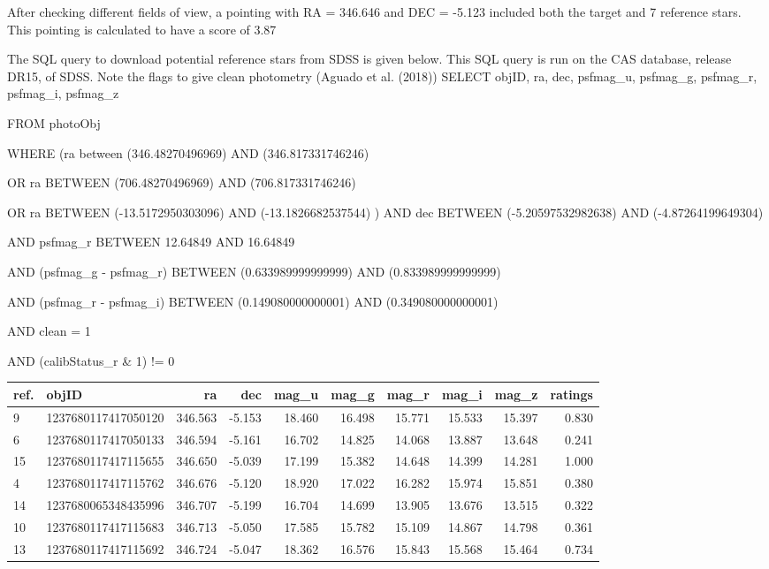 \documentclass[]{elsarticle} %
\begin{document}
After checking different fields of view, a pointing with RA = 346.646
and DEC = -5.123 included both the target and 7 reference stars. This
pointing is calculated to have a score of 3.87 \newpage

The SQL query to download potential reference stars from SDSS is given
below. This SQL query is run on the CAS database, release DR15, of SDSS.
Note the flags to give clean photometry (Aguado et al. (2018))
\vskip 0.2in \noindent SELECT objID, ra, dec, psfmag\_u, psfmag\_g,
psfmag\_r, psfmag\_i, psfmag\_z

FROM photoObj

WHERE (ra between (346.48270496969) AND (346.817331746246)

OR ra BETWEEN (706.48270496969) AND (706.817331746246)

OR ra BETWEEN (-13.5172950303096) AND (-13.1826682537544) ) AND dec
BETWEEN (-5.20597532982638) AND (-4.87264199649304)

AND psfmag\_r BETWEEN 12.64849 AND 16.64849

AND (psfmag\_g - psfmag\_r) BETWEEN (0.633989999999999) AND
(0.833989999999999)

AND (psfmag\_r - psfmag\_i) BETWEEN (0.149080000000001) AND
(0.349080000000001)

AND clean = 1

AND (calibStatus\_r \& 1) != 0 \vskip 0.2in

\begin{tabular}{l|l|r|r|r|r|r|r|r|r}
\hline
ref. & objID & ra & dec & mag\_u & mag\_g & mag\_r & mag\_i & mag\_z & ratings\\
\hline
9 & 1237680117417050120 & 346.563 & -5.153 & 18.460 & 16.498 & 15.771 & 15.533 & 15.397 & 0.830\\
\hline
6 & 1237680117417050133 & 346.594 & -5.161 & 16.702 & 14.825 & 14.068 & 13.887 & 13.648 & 0.241\\
\hline
15 & 1237680117417115655 & 346.650 & -5.039 & 17.199 & 15.382 & 14.648 & 14.399 & 14.281 & 1.000\\
\hline
4 & 1237680117417115762 & 346.676 & -5.120 & 18.920 & 17.022 & 16.282 & 15.974 & 15.851 & 0.380\\
\hline
14 & 1237680065348435996 & 346.707 & -5.199 & 16.704 & 14.699 & 13.905 & 13.676 & 13.515 & 0.322\\
\hline
10 & 1237680117417115683 & 346.713 & -5.050 & 17.585 & 15.782 & 15.109 & 14.867 & 14.798 & 0.361\\
\hline
13 & 1237680117417115692 & 346.724 & -5.047 & 18.362 & 16.576 & 15.843 & 15.568 & 15.464 & 0.734\\
\hline
\end{tabular}
\end{document}
